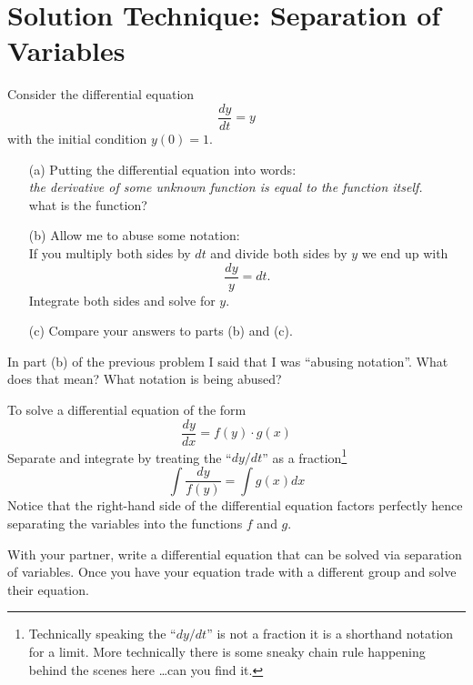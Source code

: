 \newpage
\section{Solution Technique: Separation of Variables}
\begin{problem}
    Consider the differential equation 
    \[ \frac{dy}{dt} = y \]
    with the initial condition $y(0) = 1$.
    \begin{enumerate}
        \item[(a)] Putting the differential equation into words: \\ {\it the derivative of
            some unknown function is equal to the function itself.} \\
            what is the function?
        \item[(b)] Allow me to abuse some notation: \\
            If you multiply both sides by $dt$ and divide both sides by $y$ we end up with
            \[ \frac{dy}{y} = dt. \]
            Integrate both sides and solve for $y$.
        \item[(c)] Compare your answers to parts (b) and (c).
    \end{enumerate}
\end{problem}

\begin{problem}
    In part (b) of the previous problem I said that I was ``abusing notation''.  What does
    that mean?  What notation is being abused?
\end{problem}

\begin{technique}
    To solve a differential equation of the form
    \[ \frac{dy}{dx} = f(y)\cdot g(x) \]
    Separate and integrate by treating the ``$dy/dt$'' as a fraction\footnote{Technically
        speaking the ``$dy/dt$'' is not a fraction it is a shorthand notation for a
    limit.  More technically there is some sneaky chain rule happening behind the scenes
here \ldots can you find it.}
    \[ \int \frac{dy}{f(y)} = \int g(x) dx \]
    Notice that the right-hand side of the differential equation factors perfectly hence
    separating the variables into the functions $f$ and $g$.
\end{technique}

\begin{problem}
    With your partner, write a differential equation that can be solved via separation of
    variables.  Once you have your equation trade with a different group and solve their
    equation.
\end{problem}

